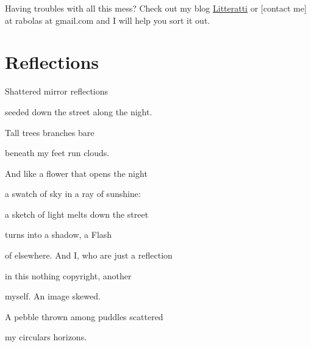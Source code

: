 \documentclass[]{book}
\begin{document}
Having troubles with all this mess? Check out my blog
\href{http://litteratti.wordpress.com/}{Litteratti} or {[}contact me{]}
at rabolas at gmail.com and I will help you sort it out.

\chapter{Reflections}\label{reflections}

Shattered mirror reflections

seeded down the street along the night.

Tall trees branches bare

beneath my feet run clouds.

And like a flower that opens the night

a swatch of sky in a ray of sunshine:

a sketch of light melts down the street

turns into a shadow, a Flash

of elsewhere. And I, who are just a reflection

in this nothing copyright, another

myself. An image skewed.

A pebble thrown among puddles scattered

my circulars horizons.
\end{document}
